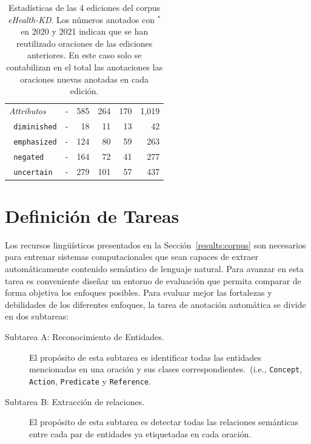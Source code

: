 \begin{table}[tpb]
{\begin{tabular}{lrrrrr}
            \midrule
            \textit{Attributos}    & -                                              & 585           & 264           & 170           & 1,019          \\
            \texttt{ diminished}   & -                                              & 18            & 11            & 13            & 42             \\
            \texttt{ emphasized}   & -                                              & 124           & 80            & 59            & 263            \\
            \texttt{ negated}      & -                                              & 164           & 72            & 41            & 277            \\
            \texttt{ uncertain}    & -                                              & 279           & 101           & 57            & 437            \\
            \bottomrule
        \end{tabular}}
    \caption[Estadísticas del corpus \textit{eHealth-KD}.]{Estadísticas de las 4 ediciones del corpus \textit{eHealth-KD}. Los números anotados con ${}^*$ en 2020 y 2021 indican que se han reutilizado oraciones de las ediciones anteriores. En este caso solo se contabilizan en el total las anotaciones las oraciones nuevas anotadas en cada edición.}
    \label{tab:corpus}
\end{table}

\section{Definición de Tareas}\label{results:tasks}

Los recursos lingüísticos presentados en la Sección~\ref{results:corpus} son necesarios para entrenar sistemas computacionales que sean capaces de extraer automáticamente contenido semántico de lenguaje natural. Para avanzar en esta tarea es conveniente diseñar un entorno de evaluación que permita comparar de forma objetiva los enfoques posibles. Para evaluar mejor las fortalezas y debilidades de los diferentes enfoques, la tarea de anotación automática se divide en dos subtareas:

\begin{description}
    \item[Subtarea A: Reconocimiento de Entidades.]
          El propósito de esta subtarea es identificar todas las entidades mencionadas en una oración y sus clases correspondientes.~(i.e., \texttt{Concept}, \texttt{Action}, \texttt{Predicate} y \texttt{Reference}.

    \item[Subtarea B: Extracción de relaciones.]
          El propósito de esta subtarea es detectar todas las relaciones semánticas entre cada par de entidades ya etiquetadas en cada oración.
\end{description}

